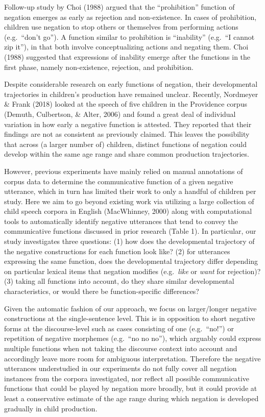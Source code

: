 \documentclass[10pt, letterpaper]{article}
\begin{document}
Follow-up study by Choi (1988) argued that the ``prohibition'' function
of negation emerges as early as rejection and non-existence. In cases of
prohibition, children use negation to stop others or themselves from
performing actions (e.g.~``don't go''). A function similar to
prohibition is ``inability'' (e.g.~``I cannot zip it''), in that both
involve conceptualizing actions and negating them. Choi (1988) suggested
that expressions of inability emerge after the functions in the first
phase, namely non-existence, rejection, and prohibition.

Despite considerable research on early functions of negation, their
developmental trajectories in children's production have remained
unclear. Recently, Nordmeyer \& Frank (2018) looked at the speech of
five children in the Providence corpus (Demuth, Culbertson, \& Alter,
2006) and found a great deal of individual variation in how early a
negative function is attested. They reported that their findings are not
as consistent as previously claimed. This leaves the possibility that
across (a larger number of) children, distinct functions of negation
could develop within the same age range and share common production
trajectories.

However, previous experiments have mainly relied on manual annotations
of corpus data to determine the communicative function of a given
negative utterance, which in turn has limited their work to only a
handful of children per study. Here we aim to go beyond existing work
via utilizing a large collection of child speech corpora in English
(MacWhinney, 2000) along with computational tools to automatically
identify negative utterances that tend to convey the communicative
functions discussed in prior research (Table 1). In particular, our
study investigates three questions: (1) how does the developmental
trajectory of the negative constructions for each function look like?
(2) for utterances expressing the same function, does the developmental
trajectory differ depending on particular lexical items that negation
modifies (e.g.~\emph{like} or \emph{want} for rejection)? (3) taking all
functions into account, do they share similar developmental
characteristics, or would there be function-specific differences?

Given the automatic fashion of our approach, we focus on larger/longer
negative constructions at the single-sentence level. This is in
opposition to short negative forms at the discourse-level such as cases
consisting of one (e.g.~``no!'') or repetition of negative morphemes
(e.g.~``no no no''), which arguably could express multiple functions
when not taking the discourse context into account and accordingly leave
more room for ambiguous interpretation. Therefore the negative
utterances understudied in our experiments do not fully cover all
negation instances from the corpora investigated, nor reflect all
possible communicative functions that could be played by negation more
broadly, but it could provide at least a conservative estimate of the
age range during which negation is developed gradually in child
production.
\end{document}
